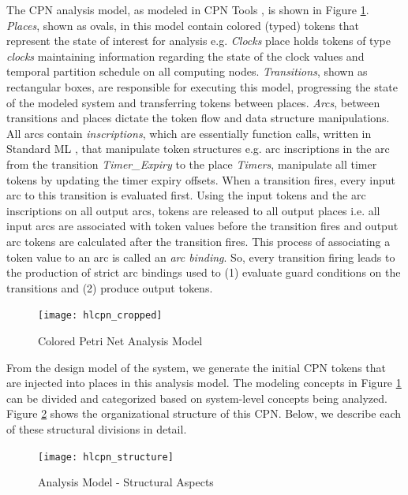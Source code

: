 The CPN analysis model, as modeled in CPN Tools \cite{CPNTools}, is shown in Figure \ref{fig:hlcpn}. \emph{Places}, shown as ovals, in this model contain colored (typed) tokens that represent the state of interest for analysis e.g. \emph{Clocks} place holds tokens of type \emph{clocks} maintaining information regarding the state of the clock values and temporal partition schedule on all computing nodes. \emph{Transitions}, shown as rectangular boxes, are responsible for executing this model, progressing the state of the modeled system and transferring tokens between places. \emph{Arcs}, between transitions and places dictate the token flow and data structure manipulations. All arcs contain \emph{inscriptions}, which are essentially function calls, written in Standard ML \cite{milner1997definition}, that manipulate token structures e.g. arc inscriptions in the arc from the transition \emph{Timer\_Expiry} to the place \emph{Timers}, manipulate all timer tokens by updating the timer expiry offsets. When a transition fires, every input arc to this transition is evaluated first. Using the input tokens and the arc inscriptions on all output arcs, tokens are released to all output places i.e. all input arcs are associated with token values before the transition fires and output arc tokens are calculated after the transition fires. This process of associating a token value to an arc is called an \emph{arc binding}. So, every transition firing leads to the production of strict arc bindings used to (1) evaluate guard conditions on the transitions and (2) produce output tokens.

\begin{figure}[h]
	\centering
	\texttt{[image: hlcpn\_cropped]}
	\caption{Colored Petri Net Analysis Model}
	\label{fig:hlcpn}
\end{figure}

From the design model of the system, we generate the initial CPN tokens that are injected into places in this analysis model. The modeling concepts in Figure \ref{fig:hlcpn} can be divided and categorized based on system-level concepts being analyzed. Figure \ref{fig:hlcpn_structure} shows the organizational structure of this CPN. Below, we describe each of these structural divisions in detail. 

\begin{figure}[h]
	\centering
	\texttt{[image: hlcpn\_structure]}
	\caption{Analysis Model - Structural Aspects}
	\label{fig:hlcpn_structure}
\end{figure}

